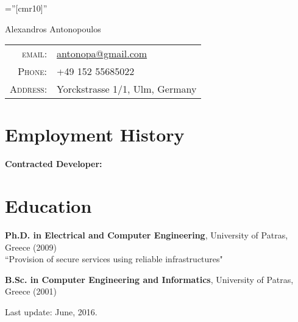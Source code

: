 \documentclass[a4paper,10pt]{article}
\newenvironment{contract_work}
{
    \renewcommand\descriptionlabel[1]{\hspace{\labelsep}{##1,}}

\begin{description}[leftmargin=0cm, labelwidth=0cm, labelsep=0.1cm]
}
{\end{description} }
\begin{document}
\pagestyle{fancyplain}
\renewcommand{\headrulewidth}{0.0pt}
\lhead{}
\chead{}
\rhead{}
\lfoot{}
\cfoot{}
\font\fb=''[cmr10]'' %

\par{\centering
        {\Huge Alexandros Antonopoulos
    }\bigskip\par}

\begin{tabular}{rl}
    \textsc{email:}     & \href{mailto:antonopa@gmail.com}{antonopa@gmail.com} \\
    \textsc{Phone:}     & +49 152 55685022 \\
    \textsc{Address:}   & Yorckstrasse 1/1, Ulm, Germany
\end{tabular}

\section{Employment History}
\begin{description}
  
  
  
  \item \textbf{Contracted Developer:}
  \begin{contract_work}
    
    
  \end{contract_work}
  
\end{description}



\section{Education}
\begin{description}
    \item \textbf{Ph.D. in Electrical and Computer Engineering}, University of Patras, Greece (2009)\\
    ``Provision of secure services using reliable infrastructures"
    \item \textbf{B.Sc. in Computer Engineering and Informatics}, University of Patras, Greece (2001)
\end{description}

%


\vfill \hfill Last update: June, 2016.
\end{document}
